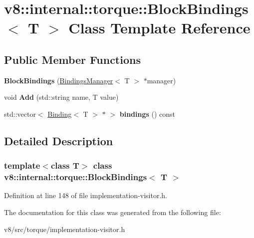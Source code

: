 \hypertarget{classv8_1_1internal_1_1torque_1_1BlockBindings}{}\section{v8\+:\+:internal\+:\+:torque\+:\+:Block\+Bindings$<$ T $>$ Class Template Reference}
\label{classv8_1_1internal_1_1torque_1_1BlockBindings}
\subsection*{Public Member Functions}
\begin{DoxyCompactItemize}
\item 
\mbox{\label{classv8_1_1internal_1_1torque_1_1BlockBindings_ac389e6d42631c7a7e9faf9fe367f0335}} 
{\bfseries Block\+Bindings} (\mbox{\hyperlink{classv8_1_1internal_1_1torque_1_1BindingsManager}{Bindings\+Manager}}$<$ T $>$ $\ast$manager)
\item 
\mbox{\label{classv8_1_1internal_1_1torque_1_1BlockBindings_a4cf44c1a9011c572f3f926466f9029ae}} 
void {\bfseries Add} (std\+::string name, T value)
\item 
\mbox{\label{classv8_1_1internal_1_1torque_1_1BlockBindings_aff1fc5c62efda4adf8f7e12f73e928b8}} 
std\+::vector$<$ \mbox{\hyperlink{classv8_1_1internal_1_1torque_1_1Binding}{Binding}}$<$ T $>$ $\ast$ $>$ {\bfseries bindings} () const
\end{DoxyCompactItemize}


\subsection{Detailed Description}
\subsubsection*{template$<$class T$>$\newline
class v8\+::internal\+::torque\+::\+Block\+Bindings$<$ T $>$}



Definition at line 148 of file implementation-\/visitor.\+h.



The documentation for this class was generated from the following file\+:\begin{DoxyCompactItemize}
\item 
v8/src/torque/implementation-\/visitor.\+h\end{DoxyCompactItemize}
